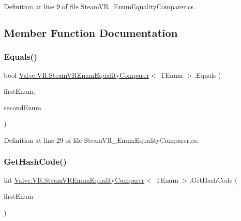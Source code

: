 Definition at line 9 of file Steam\+V\+R\+\_\+\+Enum\+Equality\+Comparer.\+cs.



\subsection{Member Function Documentation}
\mbox{\label{struct_valve_1_1_v_r_1_1_steam_v_r_enum_equality_comparer_ab8c7ca0dd56dc1ee1349453a31b954b8}} 
\subsubsection{\texorpdfstring{Equals()}{Equals()}}
{\footnotesize\ttfamily bool \mbox{\hyperlink{struct_valve_1_1_v_r_1_1_steam_v_r_enum_equality_comparer}{Valve.\+V\+R.\+Steam\+V\+R\+Enum\+Equality\+Comparer}}$<$ T\+Enum $>$.Equals (\begin{DoxyParamCaption}\item[{T\+Enum}]{first\+Enum,  }\item[{T\+Enum}]{second\+Enum }\end{DoxyParamCaption})}



Definition at line 29 of file Steam\+V\+R\+\_\+\+Enum\+Equality\+Comparer.\+cs.

\mbox{\label{struct_valve_1_1_v_r_1_1_steam_v_r_enum_equality_comparer_a0f820207fa8645ff926fd05fb6d7ecd4}} 
\subsubsection{\texorpdfstring{GetHashCode()}{GetHashCode()}}
{\footnotesize\ttfamily int \mbox{\hyperlink{struct_valve_1_1_v_r_1_1_steam_v_r_enum_equality_comparer}{Valve.\+V\+R.\+Steam\+V\+R\+Enum\+Equality\+Comparer}}$<$ T\+Enum $>$.Get\+Hash\+Code (\begin{DoxyParamCaption}\item[{T\+Enum}]{first\+Enum }\end{DoxyParamCaption})}




